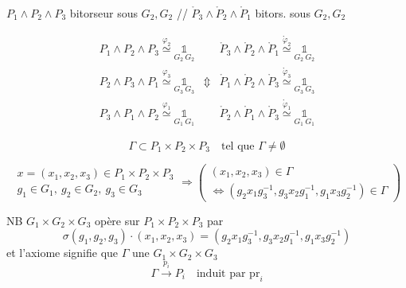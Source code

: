 \documentclass[11pt,a4paper]{article}
\begin{document}
$P_1 \wedge P_2 \wedge P_3$ bitorseur sous $G_2, G_2$ \quad // \quad
$\mathring{P}_3 \wedge \mathring{P}_2 \wedge \mathring{P}_1$ bitors. sous $G_2, G_2$

\[
\begin{array}{lcl}
P_1 \wedge P_2 \wedge P_3 \overset{\varphi_2}{\simeq} \underset{G_2\ G_2}{\mathbb{1}}
& & \mathring{P}_3 \wedge \mathring{P}_2 \wedge \mathring{P}_1 \overset{\mathring\varphi_2}{\simeq} \underset{G_2\ G_2}{\mathbb{1}} \\
P_2 \wedge P_3 \wedge P_1 \overset{\varphi_3}{\simeq} \underset{G_3\ G_3}{\mathbb{1}}
& \Updownarrow & \mathring{P}_1 \wedge \mathring{P}_2 \wedge \mathring{P}_3 \overset{\mathring\varphi_3}{\simeq} \underset{G_3\ G_3}{\mathbb{1}} \\
P_3 \wedge P_1 \wedge P_2 \overset{\varphi_1}{\simeq} \underset{G_1\ G_1}{\mathbb{1}}
& & \mathring{P}_2 \wedge \mathring{P}_1 \wedge \mathring{P}_3 \overset{\mathring\varphi_1}{\simeq} \underset{G_1\ G_1}{\mathbb{1}}
\end{array}
\]

\[
\Gamma \subset P_1 \times P_2 \times P_3 \quad \text{tel que } \Gamma \neq \emptyset
\]

\[
\left.
\begin{array}{l}
x = (x_1, x_2, x_3) \in P_1 \times P_2 \times P_3 \\
g_1 \in G_1,\ g_2 \in G_2,\ g_3 \in G_3
\end{array}
\right.
\Longrightarrow
\left(
\begin{array}{l}
(x_1, x_2, x_3) \in \Gamma \\
\iff (g_2 x_1 g_3^{-1}, g_3 x_2 g_1^{-1}, g_1 x_3 g_2^{-1}) \in \Gamma
\end{array}
\right)
\]

NB $G_1 \times G_2 \times G_3$ opère sur $P_1 \times P_2 \times P_3$ par
\[
\sigma(g_1, g_2, g_3) \cdot (x_1, x_2, x_3) = (g_2 x_1 g_3^{-1}, g_3 x_2 g_1^{-1}, g_1 x_3 g_2^{-1})
\]
et l'axiome  signifie que $\Gamma$  une
  $G_1 \times G_2 \times G_3$
\[
\Gamma \xrightarrow{\ p_i\ } P_i \quad \text{induit par } \mathrm{pr}_i
\]
\end{document}
